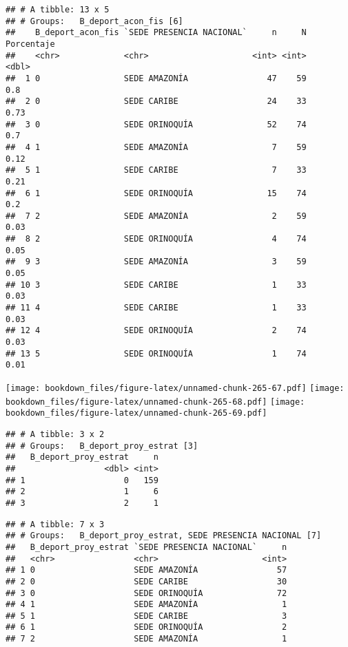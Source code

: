 \documentclass[]{article}
\theoremstyle{definition}
\theoremstyle{definition}
\theoremstyle{definition}
\theoremstyle{remark}
\begin{document}
\begin{verbatim}
## # A tibble: 13 x 5
## # Groups:   B_deport_acon_fis [6]
##    B_deport_acon_fis `SEDE PRESENCIA NACIONAL`     n     N Porcentaje
##    <chr>             <chr>                     <int> <int>      <dbl>
##  1 0                 SEDE AMAZONÍA                47    59       0.8 
##  2 0                 SEDE CARIBE                  24    33       0.73
##  3 0                 SEDE ORINOQUÍA               52    74       0.7 
##  4 1                 SEDE AMAZONÍA                 7    59       0.12
##  5 1                 SEDE CARIBE                   7    33       0.21
##  6 1                 SEDE ORINOQUÍA               15    74       0.2 
##  7 2                 SEDE AMAZONÍA                 2    59       0.03
##  8 2                 SEDE ORINOQUÍA                4    74       0.05
##  9 3                 SEDE AMAZONÍA                 3    59       0.05
## 10 3                 SEDE CARIBE                   1    33       0.03
## 11 4                 SEDE CARIBE                   1    33       0.03
## 12 4                 SEDE ORINOQUÍA                2    74       0.03
## 13 5                 SEDE ORINOQUÍA                1    74       0.01
\end{verbatim}

\texttt{[image: bookdown\_files/figure-latex/unnamed-chunk-265-67.pdf]}
\texttt{[image: bookdown\_files/figure-latex/unnamed-chunk-265-68.pdf]}
\texttt{[image: bookdown\_files/figure-latex/unnamed-chunk-265-69.pdf]}

\begin{verbatim}
## # A tibble: 3 x 2
## # Groups:   B_deport_proy_estrat [3]
##   B_deport_proy_estrat     n
##                  <dbl> <int>
## 1                    0   159
## 2                    1     6
## 3                    2     1
\end{verbatim}

\begin{verbatim}
## # A tibble: 7 x 3
## # Groups:   B_deport_proy_estrat, SEDE PRESENCIA NACIONAL [7]
##   B_deport_proy_estrat `SEDE PRESENCIA NACIONAL`     n
##   <chr>                <chr>                     <int>
## 1 0                    SEDE AMAZONÍA                57
## 2 0                    SEDE CARIBE                  30
## 3 0                    SEDE ORINOQUÍA               72
## 4 1                    SEDE AMAZONÍA                 1
## 5 1                    SEDE CARIBE                   3
## 6 1                    SEDE ORINOQUÍA                2
## 7 2                    SEDE AMAZONÍA                 1
\end{verbatim}
\end{document}
